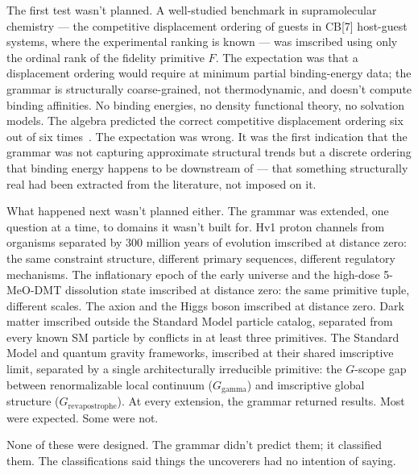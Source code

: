 \documentclass[12pt,a4paper]{article}
\begin{document}
The first test wasn't planned. A well-studied benchmark in
supramolecular chemistry --- the competitive displacement ordering of
guests in CB[7] host-guest systems, where the experimental ranking is
known --- was imscribed using only the ordinal rank of the fidelity
primitive $F$. The expectation was that a displacement ordering would
require at minimum partial binding-energy data; the grammar is
structurally coarse-grained, not thermodynamic, and doesn't compute
binding affinities. No binding energies, no density functional theory,
no solvation models. The algebra predicted the correct competitive
displacement ordering six out of six times~\cite{kim2001,assaf2015}.
The expectation was wrong. It was the first indication that the grammar
was not capturing approximate structural trends but a discrete ordering
that binding energy happens to be downstream of --- that something
structurally real had been extracted from the literature, not imposed
on it.

What happened next wasn't planned either. The grammar was extended,
one question at a time, to domains it wasn't built for. Hv1 proton
channels from organisms separated by 300 million years of evolution
imscribed at distance zero: the same constraint structure, different
primary sequences, different regulatory mechanisms. The inflationary
epoch of the early universe and the high-dose 5-MeO-DMT dissolution
state imscribed at distance zero: the same primitive tuple, different
scales. The axion and the Higgs boson imscribed at distance zero. Dark
matter imscribed outside the Standard Model particle catalog, separated
from every known SM particle by conflicts in at least three primitives.
The Standard Model and quantum gravity frameworks, imscribed at their shared
imscriptive limit, separated by a single architecturally irreducible primitive:
the $G$-scope gap between renormalizable local continuum ($G_{\text{gamma}}$) and
imscriptive global structure ($G_{\text{revapostrophe}}$). At every extension, the grammar returned results.
Most were expected. Some were not.

None of these were designed. The grammar didn't predict them; it classified them.
The classifications said things the uncoverers had no intention of saying.
\end{document}

